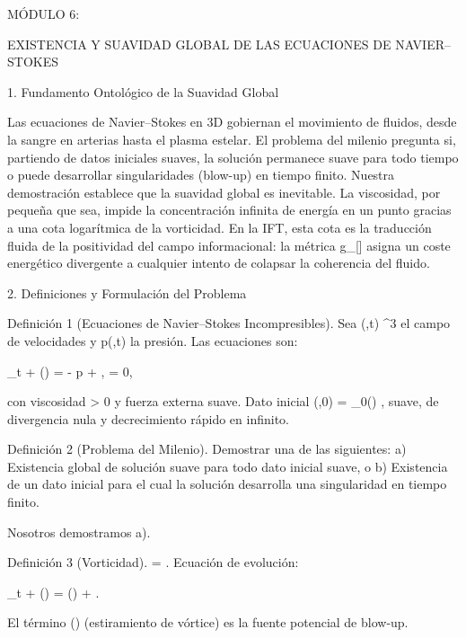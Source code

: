 \documentclass[12pt,a4paper]{book}
\begin{document}
MÓDULO 6:

EXISTENCIA Y SUAVIDAD GLOBAL DE LAS ECUACIONES DE NAVIER–STOKES

1. Fundamento Ontológico de la Suavidad Global

Las ecuaciones de Navier–Stokes en 3D gobiernan el movimiento de fluidos, desde la sangre en arterias hasta el plasma estelar. El problema del milenio pregunta si, partiendo de datos iniciales suaves, la solución permanece suave para todo tiempo o puede desarrollar singularidades (blow-up) en tiempo finito. Nuestra demostración establece que la suavidad global es inevitable. La viscosidad, por pequeña que sea, impide la concentración infinita de energía en un punto gracias a una cota logarítmica de la vorticidad. En la IFT, esta cota es la traducción fluida de la positividad del campo informacional: la métrica  g_{\mu\nu}[\rho]  asigna un coste energético divergente a cualquier intento de colapsar la coherencia del fluido.

2. Definiciones y Formulación del Problema

Definición 1 (Ecuaciones de Navier–Stokes Incompresibles).
Sea  (,t) \in {}^3  el campo de velocidades y  p(,t) \in {}  la presión. Las ecuaciones son:

\partial_t  + (\cdot\nabla) = \nu \Delta {} - \nabla p + , \qquad \nabla\cdot{} = 0,

con viscosidad  \nu > 0  y fuerza externa    suave. Dato inicial  (,0) = _0() , suave, de divergencia nula y decrecimiento rápido en infinito.

Definición 2 (Problema del Milenio).
Demostrar una de las siguientes:
a) Existencia global de solución suave para todo dato inicial suave, o
b) Existencia de un dato inicial para el cual la solución desarrolla una singularidad en tiempo finito.

Nosotros demostramos a).

Definición 3 (Vorticidad).
 \boldsymbol{\omega} = \nabla\times{} . Ecuación de evolución:

\partial_t \boldsymbol{\omega} + (\cdot\nabla)\boldsymbol{\omega} = (\boldsymbol{\omega}\cdot\nabla) + \nu \Delta \boldsymbol{\omega}.

El término  (\boldsymbol{\omega}\cdot\nabla)  (estiramiento de vórtice) es la fuente potencial de blow-up.
\end{document}

